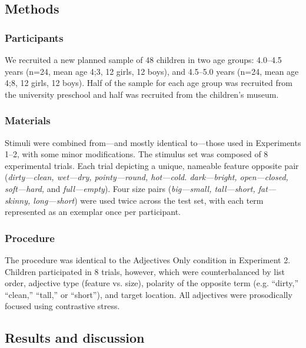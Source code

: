 \documentclass[man]{apa2}
\begin{document}
\subsection{Methods}

\subsubsection{Participants}

We recruited a new planned sample of 48 children in two age groups: 4.0--4.5 years (n=24, mean age 4;3, 12 girls, 12 boys), and 4.5--5.0 years (n=24, mean age 4;8, 12 girls, 12 boys).  Half of the sample for each age group was recruited from the university preschool and half was recruited from the children's museum.

\subsubsection{Materials}

Stimuli were combined from---and mostly identical to---those used in Experiments 1--2, with some minor modifications. The stimulus set was composed of 8 experimental trials.  Each trial depicting a unique, nameable feature opposite pair (\emph{dirty---clean, wet---dry, pointy---round, hot---cold. dark---bright, open---closed, soft---hard,} and \emph{full---empty}). Four size pairs (\emph{big---small, tall---short, fat---skinny, long---short}) were used twice across the test set, with each term represented as an exemplar once per participant.  

\subsubsection{Procedure}

The procedure was identical to the Adjectives Only condition in Experiment 2. Children participated in 8 trials, however, which were counterbalanced by list order, adjective type (feature vs. size), polarity of the opposite term (e.g. ``dirty,'' ``clean,'' ``tall,'' or ``short''), and target location. All adjectives were prosodically focused using contrastive stress. 

\subsection{Results and discussion}
\end{document}
